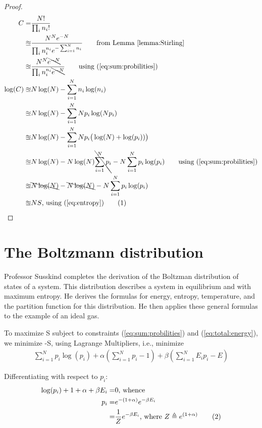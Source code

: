 \documentclass[]{article}
\newcommand\numberthis{\addtocounter{equation}{1}\tag{\theequation}}
\begin{document}
\begin{proof}
	\begin{align*}
	C=&\frac{N!}{\prod_{i}n_i!}\\
	\approxeq& \frac{N^N e^{-N}}{\prod_{i}n_i^{n_i} e^{-\sum_{i=1}^{N}n_i}}\tag*{from Lemma \ref{lemma:Stirling}}\\
	\approxeq& \frac{N^N \bcancel{e^{-N}}}{\prod_{i}n_i^{n_i} \bcancel{e^{-N}}}\tag*{using (\ref{eq:sum:probilities})}\\
	\log(C) \approxeq & N \log(N) - \sum_{i=1}^{N} n_i \log(n_i)\\
	\approxeq& N \log(N) - \sum_{i=1}^{N} N p_i \log(N p_i)\\
	\approxeq& N \log(N) - \sum_{i=1}^{N} N p_i \big(\log(N) + \log(p_i))\big)\\
	\approxeq& N \log(N) -  N \log(N) \bcancel{\sum_{i=1}^{N} p_i}  - N \sum_{i=1}^{N}p_i \log(p_i)\tag*{using (\ref{eq:sum:probilities})}\\
	\approxeq& \bcancel{N \log(N)} - \bcancel{N \log(N)}  - N \sum_{i=1}^{N}p_i \log(p_i)\\
	\approxeq& NS \text{, using (\ref{eq:entropy})} \numberthis \label{eq:entropy:logC}
	\end{align*}
\end{proof}

\section{The Boltzmann distribution}

Professor Susskind completes the derivation of the Boltzman distribution of states of a system. This distribution describes a system in equilibrium and with maximum entropy. He derives the formulas for energy, entropy, temperature, and the partition function for this distribution. He then applies these general formulas to the example of an ideal gas.

To maximize S subject to constraints (\ref{eq:sum:probilities}) and (\ref{eq:total:energy}), we minimize -S, using Lagrange Multipliers, i.e., minimize
\begin{align*}
\sum_{i=1}^{N}p_i \log(p_i) + \alpha(\sum_{i=1}^{N} p_i-1) + \beta(\sum_{i=1}^{N} E_i p_i-E)
\end{align*}

Differentiating with respect to $p_i$:
\begin{align*}
\log(p_i)+1 + \alpha +\beta E_i=&0\text{, whence}\\
p_i =& e^{-(1+\alpha)} e^{-\beta E_i}\\
=& \frac{1}{Z} e^{-\beta E_i}\text{, where $Z\triangleq e^{(1+\alpha)}$} \numberthis\label{eq:maximize:entropy}
\end{align*}
\end{document}
